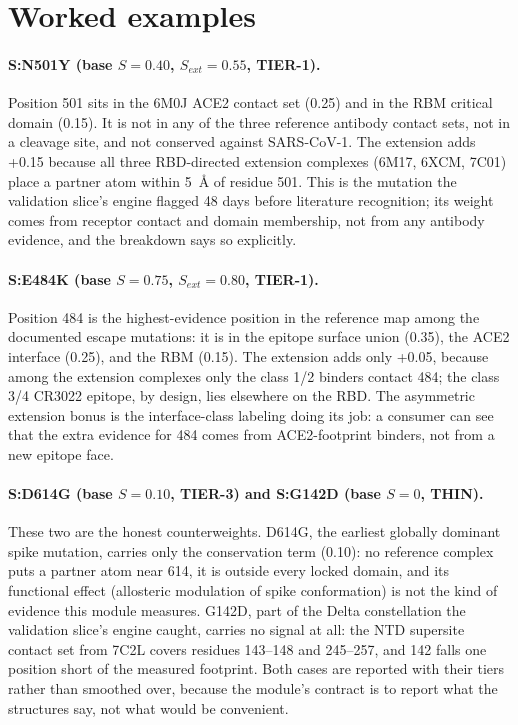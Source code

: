 \documentclass[11pt]{article}
\begin{document}
\section{Worked examples}
\paragraph{S:N501Y (base $S=0.40$, $S_{ext}=0.55$, TIER-1).} Position 501 sits in the 6M0J ACE2 contact set (0.25) and in the RBM critical domain (0.15). It is not in any of the three reference antibody contact sets, not in a cleavage site, and not conserved against SARS-CoV-1. The extension adds +0.15 because all three RBD-directed extension complexes (6M17, 6XCM, 7C01) place a partner atom within 5~\AA{} of residue 501. This is the mutation the validation slice's engine flagged 48 days before literature recognition; its weight comes from receptor contact and domain membership, not from any antibody evidence, and the breakdown says so explicitly.

\paragraph{S:E484K (base $S=0.75$, $S_{ext}=0.80$, TIER-1).} Position 484 is the highest-evidence position in the reference map among the documented escape mutations: it is in the epitope surface union (0.35), the ACE2 interface (0.25), and the RBM (0.15). The extension adds only +0.05, because among the extension complexes only the class 1/2 binders contact 484; the class 3/4 CR3022 epitope, by design, lies elsewhere on the RBD. The asymmetric extension bonus is the interface-class labeling doing its job: a consumer can see that the extra evidence for 484 comes from ACE2-footprint binders, not from a new epitope face.

\paragraph{S:D614G (base $S=0.10$, TIER-3) and S:G142D (base $S=0$, THIN).} These two are the honest counterweights. D614G, the earliest globally dominant spike mutation, carries only the conservation term (0.10): no reference complex puts a partner atom near 614, it is outside every locked domain, and its functional effect (allosteric modulation of spike conformation) is not the kind of evidence this module measures. G142D, part of the Delta constellation the validation slice's engine caught, carries no signal at all: the NTD supersite contact set from 7C2L covers residues 143--148 and 245--257, and 142 falls one position short of the measured footprint. Both cases are reported with their tiers rather than smoothed over, because the module's contract is to report what the structures say, not what would be convenient.
\end{document}
